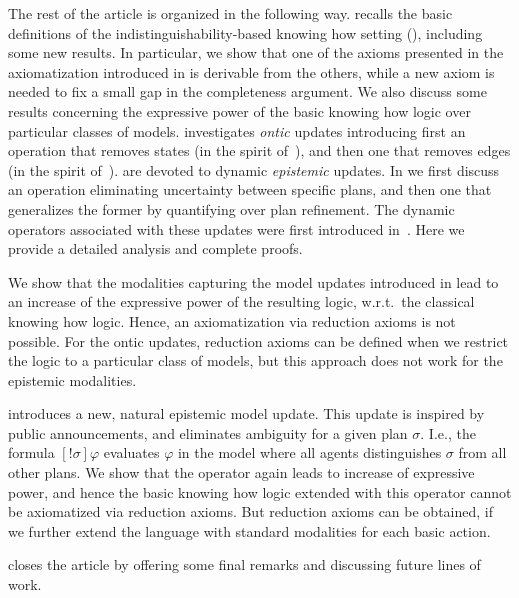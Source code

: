 \begin{mrevised}
The rest of the article is organized in the following way.  recalls the basic definitions of the indistinguishability-based knowing how setting (\cite{AFSVQ21,AFSVQ23report}), including some new results. In particular, we show that one of the axioms presented in the axiomatization introduced in \cite{AFSVQ21,AFSVQ23report} is derivable from the others, while a new axiom is needed to fix a small gap in the completeness argument. We also discuss some results concerning the expressive power of the basic knowing how logic over particular classes of models.  investigates \emph{ontic} updates introducing first an operation that removes states (in the spirit of~\cite{Plaza89:lopc}), and then one that removes edges (in the spirit of~\cite{KooiR11}).  are devoted to dynamic \emph{epistemic} updates. 
In  we first discuss an operation eliminating uncertainty between specific plans, and then one that generalizes the former by quantifying over plan refinement. 
The dynamic operators associated with these updates were first introduced in~\cite{AFSV22}. Here we provide a detailed analysis and complete proofs.  

We show that the modalities capturing the model updates introduced in  lead to an increase of the expressive power of the resulting logic, w.r.t.\ the classical knowing how logic. Hence, an axiomatization via reduction axioms is not possible. For the ontic updates, reduction axioms can be defined when we restrict the logic to a particular class of models, but this approach does not work for the epistemic modalities. 

 introduces a new, natural epistemic model update.  This update is inspired by public announcements, and eliminates ambiguity for a given plan $\sigma$. I.e., the formula $[!\sigma]\varphi$ evaluates $\varphi$ in the model where all agents distinguishes $\sigma$ from all other plans. We show that the operator again leads 
to increase of expressive power, and hence the basic knowing how logic extended with this operator cannot be axiomatized via reduction axioms.  But reduction axioms can be obtained, if we further extend the language with standard modalities for each basic action. 
 
 closes the article by offering some final remarks and discussing future lines of work.
\end{mrevised}

